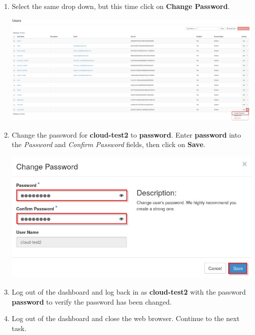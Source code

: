 \documentclass[letterpaper, 12pt]{article}
\begin{document}
\begin{enumerate}
    \item Select the same drop down, but this time click on \textbf{Change Password}.

    \begin{center}
        \includegraphics[width=\linewidth]{images/part3/step11.png}
    \end{center}
    
    \item Change the password for \textbf{cloud-test2} to \textbf{password}. Enter \textbf{password} into the
    \textit{Password} and \textit{Confirm Password} fields, then click on \textbf{Save}.

    \begin{center}
        \includegraphics[width=\linewidth]{images/part3/step12.png}
    \end{center}

    \item Log out of the dashboard and log back in as \textbf{cloud-test2} with the password \textbf{password} to verify
    the password has been changed.

    \item Log out of the dashboard and close the web browser. Continue to the next task.
\end{enumerate}

\end{document}
